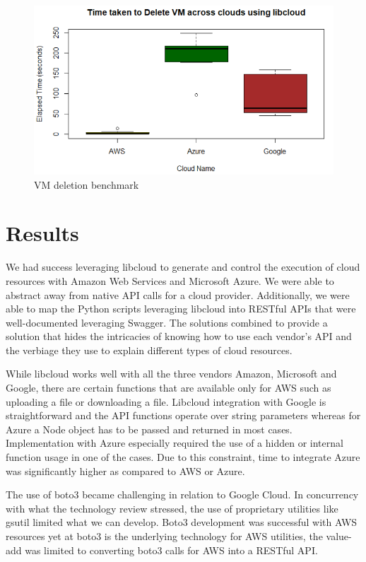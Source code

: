 \begin{figure}[!ht]
  \centering
  \includegraphics[width=\columnwidth]{images/DeleteVM.png}
  \caption{VM deletion benchmark}\label{F:vm-delete}
\end{figure}

\section{Results}
We had success leveraging libcloud to generate and control the execution of
cloud resources with Amazon Web Services and Microsoft Azure. We were able to
abstract away from native API calls for a cloud provider. Additionally, we were
able to map the Python scripts leveraging libcloud into RESTful APIs that were
well-documented leveraging Swagger. The solutions combined to provide a
solution that hides the intricacies of knowing how to use each vendor's API and
the verbiage they use to explain different types of cloud resources. 

While libcloud works well with all the three vendors Amazon, Microsoft and
Google,
there are certain functions that are available only for AWS such as uploading
a file or downloading a file. Libcloud integration with Google is
straightforward
and the API functions operate over string parameters whereas for Azure a Node
object has to be passed and returned in most cases. Implementation with Azure
especially required the use of a hidden or internal function usage in one of
the
cases. Due to this constraint, time to integrate Azure was significantly higher
as compared
to AWS or Azure.

The use of boto3 became challenging in relation to Google Cloud. In concurrency
with what the technology review stressed, the
use of proprietary utilities like
gsutil limited what we can develop. Boto3 development was successful with AWS
resources yet at boto3 is the underlying technology for AWS utilities, the
value-add was limited to converting boto3 calls for AWS into a RESTful API.


